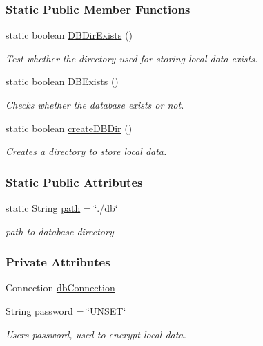 \subsubsection*{Static Public Member Functions}
\begin{DoxyCompactItemize}
\item 
static boolean \hyperlink{classballmerpeak_1_1turtlenet_1_1server_1_1Database_a89fecb924cc735abbc16d58405945fb2}{D\-B\-Dir\-Exists} ()
\begin{DoxyCompactList}\small\item\em Test whether the directory used for storing local data exists. \end{DoxyCompactList}\item 
static boolean \hyperlink{classballmerpeak_1_1turtlenet_1_1server_1_1Database_a2001d0b63c21d13d0a023d70f571c5bd}{D\-B\-Exists} ()
\begin{DoxyCompactList}\small\item\em Checks whether the database exists or not. \end{DoxyCompactList}\item 
static boolean \hyperlink{classballmerpeak_1_1turtlenet_1_1server_1_1Database_aa21c9f4bf38697e84fe76fee2023be9e}{create\-D\-B\-Dir} ()
\begin{DoxyCompactList}\small\item\em Creates a directory to store local data. \end{DoxyCompactList}\end{DoxyCompactItemize}
\subsubsection*{Static Public Attributes}
\begin{DoxyCompactItemize}
\item 
static String \hyperlink{classballmerpeak_1_1turtlenet_1_1server_1_1Database_a3933689115f43166439d740b2a254481}{path} = \char`\"{}./db\char`\"{}
\begin{DoxyCompactList}\small\item\em path to database directory \end{DoxyCompactList}\end{DoxyCompactItemize}
\subsubsection*{Private Attributes}
\begin{DoxyCompactItemize}
\item 
Connection \hyperlink{classballmerpeak_1_1turtlenet_1_1server_1_1Database_afc619b6caae48aed2aef929243b00410}{db\-Connection}
\item 
String \hyperlink{classballmerpeak_1_1turtlenet_1_1server_1_1Database_a6dc69ef37a9765547dfa556596f5ad3c}{password} = \char`\"{}U\-N\-S\-E\-T\char`\"{}
\begin{DoxyCompactList}\small\item\em Users password, used to encrypt local data. \end{DoxyCompactList}\end{DoxyCompactItemize}


